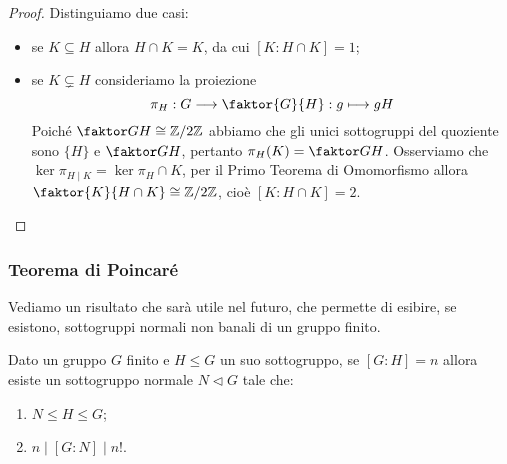 \documentclass[11pt]{scrartcl}
\begin{document}
\begin{proof}
    Distinguiamo due casi:
    \begin{itemize}
        \item se $K \subseteq H$ allora $H \cap K = K$, da cui $[K:H\cap K] = 1$;
        \item se $K \subsetneq H$ consideriamo la proiezione 
        \[
            \pi_H: G\longrightarrow \faktor{G}{H} :g \longmapsto gH
        \]
        Poiché $\faktor G H \cong \Z2$ abbiamo che gli unici sottogruppi 
        del quoziente sono $\{H\}$ e $\faktor G H$, pertanto 
        $\pi_H(K) = \faktor G H$. Osserviamo che $\ker\pi_{H\mid K}
        = \ker \pi_H \cap K$, per il Primo Teorema di Omomorfismo allora 
        $\faktor{K}{H\cap K} \cong \Z2$, cioè $[K:H\cap K] = 2$.
    \end{itemize}
\end{proof}

\subsubsection{Teorema di Poincaré}

Vediamo un risultato che sarà utile nel futuro, che permette di esibire,
se esistono, sottogruppi normali non banali di un gruppo finito.

\begin{theorem}
    \label{teorema1.50}
    Dato un gruppo $G$ finito e $H\leqslant G$ un suo sottogruppo, 
    se $[G:H] = n$ allora esiste un sottogruppo normale $N\triangleleft G$ 
    tale che:
    \begin{enumerate}[(1)]
        \item $N\leqslant H \leqslant G$;
        \item $n \mid [G:N] \mid n!$.
    \end{enumerate}
\end{theorem}
\end{document}
